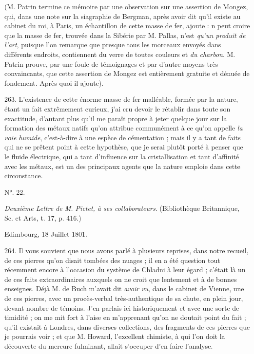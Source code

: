 \documentclass[a4paper, 11pt, oneside, polutonikogreek, french]{article}
\begin{document}
(M. Patrin termine ce mémoire par une observation sur une assertion de Mongez, qui, dans une note sur la siagraphie de Bergman, après avoir dit qu'il existe au cabinet du roi, à Paris, un échantillon de cette masse de fer, ajoute : \og n peut croire que la masse de fer, trouvée dans la Sibérie par M. Pallas, n'est \emph{qu'un produit de l'art}, puisque l'on remarque que presque tous les morceaux envoyés dans différents endroits, contiennent du verre de toutes couleurs et \emph{du charbon}. \fg M. Patrin prouve, par une foule de témoignages et par d'autre moyens très-convaincants, que cette assertion de Mongez est entièrement gratuite et dénuée de fondement. Après quoi il ajoute).

263. \og L'existence de cette énorme masse de fer malléable, formée par la nature, étant un fait extrêmement curieux, j'ai cru devoir le rétablir dans toute son exactitude, d'autant plus qu'il me paraît propre à jeter quelque jour sur la formation des métaux natifs qu'on attribue communément à ce qu'on appelle \emph{la voie humide}, c'est-à-dire à une espèce de cémentation ; mais il y a tant de faits qui ne se prêtent point à cette hypothèse, que je serai plutôt porté à penser que le fluide électrique, qui a tant d'influence sur la cristallisation et tant d'affinité avec les métaux, est un des principaux agents que la nature emploie dans cette circonstance. \fg

\begin{center}
N°. 22.
\end{center}

\emph{Deuxième Lettre de M. Pictet, à ses collaborateurs}. (Bibliothèque Britannique, Sc. et Arts, t. 17, p. 416.)

Edimbourg, 18 Juillet 1801.

264. Il vous souvient que nous avons parlé à plusieurs reprises, dans notre recueil, de ces pierres qu'on disait tombées des nuages ; il en a été question tout récemment encore à l'occasion du système de Chladni à leur égard ; c'était là un de ces faits extraordinaires auxquels on ne croit que lentement et à de bonnes enseignes. Déjà M. de Buch m'avait dit \emph{avoir vu}, dans le cabinet de Vienne, une de ces pierres, avec un procès-verbal très-authentique de sa chute, en plein jour, devant nombre de témoins. J'en parlais ici historiquement et avec une sorte de timidité ; on me mit fort à l'aise en m'apprenant qu'on ne doutait point du fait ; qu'il existait à Londres, dans diverses collections, des fragments de ces pierres que je pourrais voir ; et que M. Howard, l'excellent chimiste, à qui l'on doit la découverte du mercure fulminant, allait s'occuper d'en faire l'analyse.
\end{document}
